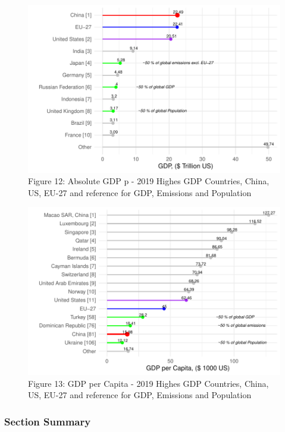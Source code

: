\documentclass[
  12pt,
]{article}
\numberwithin{equation}{section}
\numberwithin{table}{section}
\numberwithin{figure}{section}
\begin{document}
\begin{figure}
\centering
\includegraphics{Paper_files/figure-latex/unnamed-chunk-12-1.pdf}
\caption{Figure 12: Absolute GDP p - 2019 \textbar{} Highes GDP
Countries, China, US, EU-27 and reference for GDP, Emissions and
Population}
\end{figure}

\begin{figure}
\centering
\includegraphics{Paper_files/figure-latex/unnamed-chunk-13-1.pdf}
\caption{Figure 13: GDP per Capita - 2019 \textbar{} Highes GDP
Countries, China, US, EU-27 and reference for GDP, Emissions and
Population}
\end{figure}

\hypertarget{section-summary-1}{%
\subsubsection{Section Summary}\label{section-summary-1}}
\end{document}
